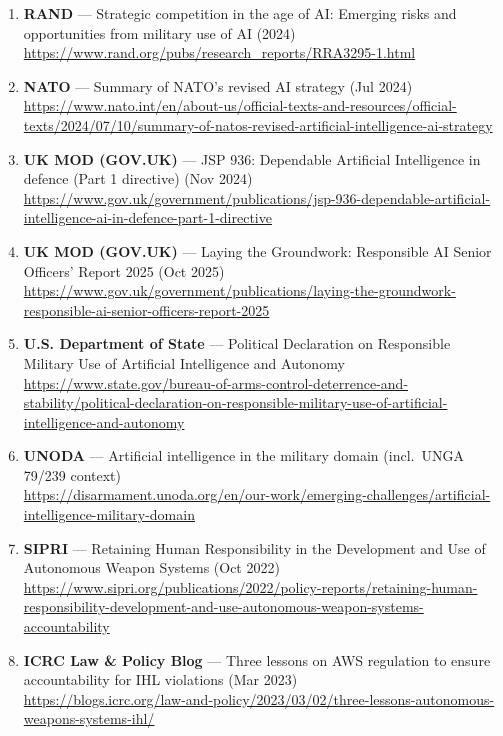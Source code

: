 \documentclass[11pt]{article}
\begin{document}
\begin{enumerate}
  \url{https://www.rand.org/pubs/research_reports/RRA4316-1.html}
\item
  \textbf{RAND} --- Strategic competition in the age of AI: Emerging
  risks and opportunities from military use of AI (2024)\\
  \url{https://www.rand.org/pubs/research_reports/RRA3295-1.html}
\item
  \textbf{NATO} --- Summary of NATO's revised AI strategy (Jul 2024)\\
  \url{https://www.nato.int/en/about-us/official-texts-and-resources/official-texts/2024/07/10/summary-of-natos-revised-artificial-intelligence-ai-strategy}
\item
  \textbf{UK MOD (GOV.UK)} --- JSP 936: Dependable Artificial
  Intelligence in defence (Part 1 directive) (Nov 2024)\\
  \url{https://www.gov.uk/government/publications/jsp-936-dependable-artificial-intelligence-ai-in-defence-part-1-directive}
\item
  \textbf{UK MOD (GOV.UK)} --- Laying the Groundwork: Responsible AI
  Senior Officers' Report 2025 (Oct 2025)\\
  \url{https://www.gov.uk/government/publications/laying-the-groundwork-responsible-ai-senior-officers-report-2025}
\item
  \textbf{U.S. Department of State} --- Political Declaration on
  Responsible Military Use of Artificial Intelligence and Autonomy\\
  \url{https://www.state.gov/bureau-of-arms-control-deterrence-and-stability/political-declaration-on-responsible-military-use-of-artificial-intelligence-and-autonomy}
\item
  \textbf{UNODA} --- Artificial intelligence in the military domain
  (incl.~UNGA 79/239 context)\\
  \url{https://disarmament.unoda.org/en/our-work/emerging-challenges/artificial-intelligence-military-domain}
\item
  \textbf{SIPRI} --- Retaining Human Responsibility in the Development
  and Use of Autonomous Weapon Systems (Oct 2022)\\
  \url{https://www.sipri.org/publications/2022/policy-reports/retaining-human-responsibility-development-and-use-autonomous-weapon-systems-accountability}
\item
  \textbf{ICRC Law \& Policy Blog} --- Three lessons on AWS regulation
  to ensure accountability for IHL violations (Mar 2023)\\
  \url{https://blogs.icrc.org/law-and-policy/2023/03/02/three-lessons-autonomous-weapons-systems-ihl/}

\end{enumerate}
\end{document}
